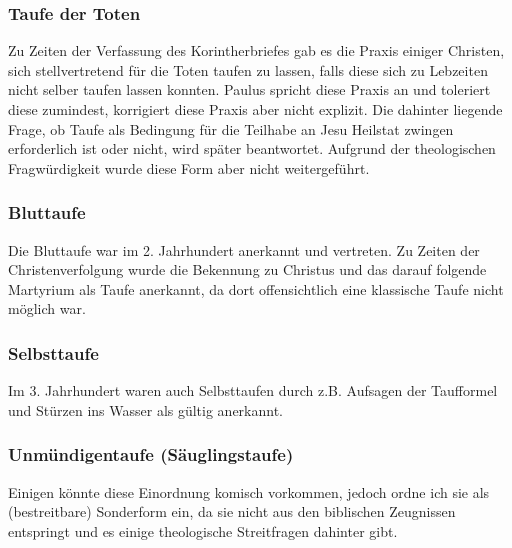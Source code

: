 \subsubsection{Taufe der Toten}
Zu Zeiten der Verfassung des Korintherbriefes gab es die Praxis einiger Christen, sich stellvertretend für die Toten taufen zu lassen, falls diese sich zu Lebzeiten nicht selber taufen lassen konnten. Paulus spricht diese Praxis an und toleriert diese zumindest, korrigiert diese Praxis aber nicht explizit. Die dahinter liegende Frage, ob Taufe als Bedingung für die Teilhabe an Jesu Heilstat zwingen erforderlich ist oder nicht, wird später beantwortet. Aufgrund der theologischen Fragwürdigkeit wurde diese Form aber nicht weitergeführt.

\subsubsection{Bluttaufe}
Die Bluttaufe war im 2. Jahrhundert anerkannt und vertreten. Zu Zeiten der Christenverfolgung wurde die Bekennung zu Christus und das darauf folgende Martyrium als Taufe anerkannt, da dort offensichtlich eine klassische Taufe nicht möglich war.

\subsubsection{Selbsttaufe}
Im 3. Jahrhundert waren auch Selbsttaufen durch z.B. Aufsagen der Taufformel und Stürzen ins Wasser als gültig anerkannt.

\subsubsection{Unmündigentaufe (Säuglingstaufe)}
Einigen könnte diese Einordnung komisch vorkommen, jedoch ordne ich sie als (bestreitbare) Sonderform ein, da sie nicht aus den biblischen Zeugnissen entspringt und es einige theologische Streitfragen dahinter gibt.

